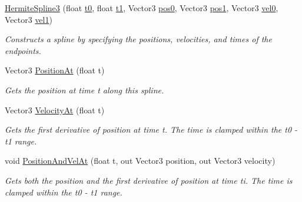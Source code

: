 \begin{DoxyCompactItemize}
\mbox{\hyperlink{struct_leap_1_1_unity_1_1_animation_1_1_hermite_spline3_aff3a894b67f3fbd0750eab21e2d0897e}{Hermite\+Spline3}} (float \mbox{\hyperlink{struct_leap_1_1_unity_1_1_animation_1_1_hermite_spline3_ae125e3515a0885a2d2f38b28ba426b3d}{t0}}, float \mbox{\hyperlink{struct_leap_1_1_unity_1_1_animation_1_1_hermite_spline3_a8378d6b2ba56008b87d178cca88716bf}{t1}}, Vector3 \mbox{\hyperlink{struct_leap_1_1_unity_1_1_animation_1_1_hermite_spline3_ab9901f2a45abfb1155ce0df806e6530a}{pos0}}, Vector3 \mbox{\hyperlink{struct_leap_1_1_unity_1_1_animation_1_1_hermite_spline3_a249eaf51c265148a63ef2b0d395bc9c2}{pos1}}, Vector3 \mbox{\hyperlink{struct_leap_1_1_unity_1_1_animation_1_1_hermite_spline3_a128d6140e17943ca3f1012404a8eaece}{vel0}}, Vector3 \mbox{\hyperlink{struct_leap_1_1_unity_1_1_animation_1_1_hermite_spline3_ab77b29135690ffc6f3671418100be381}{vel1}})
\begin{DoxyCompactList}\small\item\em Constructs a spline by specifying the positions, velocities, and times of the endpoints. \end{DoxyCompactList}\item 
Vector3 \mbox{\hyperlink{struct_leap_1_1_unity_1_1_animation_1_1_hermite_spline3_a69154d96fa6d61cfa7907ad30cc84c12}{Position\+At}} (float t)
\begin{DoxyCompactList}\small\item\em Gets the position at time t along this spline. \end{DoxyCompactList}\item 
Vector3 \mbox{\hyperlink{struct_leap_1_1_unity_1_1_animation_1_1_hermite_spline3_a06396939556c99bada087c5f1b26a361}{Velocity\+At}} (float t)
\begin{DoxyCompactList}\small\item\em Gets the first derivative of position at time t. The time is clamped within the t0 -\/ t1 range. \end{DoxyCompactList}\item 
void \mbox{\hyperlink{struct_leap_1_1_unity_1_1_animation_1_1_hermite_spline3_ab81840b44bc65f6ba0be418786f8bcff}{Position\+And\+Vel\+At}} (float t, out Vector3 position, out Vector3 velocity)
\begin{DoxyCompactList}\small\item\em Gets both the position and the first derivative of position at time ti. The time is clamped within the t0 -\/ t1 range. \end{DoxyCompactList}\end{DoxyCompactItemize}
